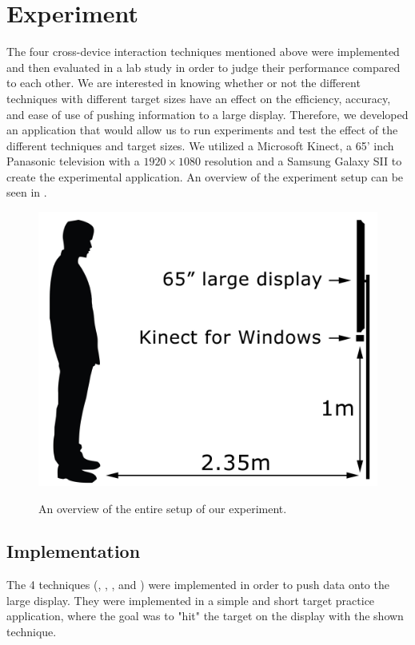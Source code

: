 \section{Experiment} \label{sec:experiment}
The four cross-device interaction techniques mentioned above were implemented and then evaluated in a lab study in order to judge their performance compared to each other. 
We are interested in knowing whether or not the different techniques with different target sizes have an effect on the efficiency, accuracy, and ease of use of pushing information to a large display. Therefore, we developed an application that would allow us to run experiments and test the effect of the different techniques and target sizes. 
We utilized a Microsoft Kinect, a 65' inch Panasonic television with a $1920 \times 1080$ resolution and a Samsung Galaxy SII to create the experimental application. 
An overview of the experiment setup can be seen in . 

\begin{figure}[H]
	\centering
	{\includegraphics[width = 0.7\columnwidth]{images/SetupIllustration.jpg}}
	\caption{
		\protect An overview of the entire setup of our experiment.
	}
	\label{fig:entireSetup}
\end{figure}

\subsection{Implementation}

The 4 techniques (\swipe, \tilt, \throw, and \pinch) were implemented in order to push data onto the large display. 
They were implemented in a simple and short target practice application, where the goal was to "hit" the target on the display with the shown technique. 

